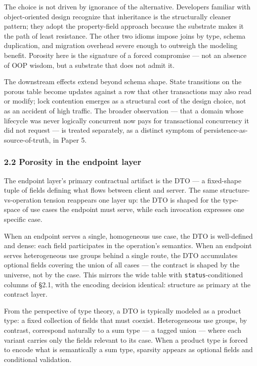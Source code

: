 \documentclass[
]{article}
\let\origtexttt\texttt%
\renewcommand{\texttt}[1]{\origtexttt{\seqsplit{#1}}}%
\let\texttt\origtexttt%
\begin{document}
The choice is not driven by ignorance of the alternative. Developers
familiar with object-oriented design recognize that inheritance is the
structurally cleaner pattern; they adopt the property-field approach
because the substrate makes it the path of least resistance. The other
two idioms impose joins by type, schema duplication, and migration
overhead severe enough to outweigh the modeling benefit. Porosity here
is the signature of a forced compromise --- not an absence of OOP
wisdom, but a substrate that does not admit it.

The downstream effects extend beyond schema shape. State transitions on
the porous table become updates against a row that other transactions
may also read or modify; lock contention emerges as a structural cost of
the design choice, not as an accident of high traffic. The broader
observation --- that a domain whose lifecycle was never logically
concurrent now pays for transactional concurrency it did not request ---
is treated separately, as a distinct symptom of
persistence-as-source-of-truth, in Paper 5.

\subsubsection{2.2 Porosity in the endpoint
layer}\label{porosity-in-the-endpoint-layer}

The endpoint layer's primary contractual artifact is the DTO --- a
fixed-shape tuple of fields defining what flows between client and
server. The same structure-vs-operation tension reappears one layer up:
the DTO is shaped for the type-space of use cases the endpoint must
serve, while each invocation expresses one specific case.

When an endpoint serves a single, homogeneous use case, the DTO is
well-defined and dense: each field participates in the operation's
semantics. When an endpoint serves heterogeneous use groups behind a
single route, the DTO accumulates optional fields covering the union of
all cases --- the contract is shaped by the universe, not by the case.
This mirrors the wide table with \texttt{status}-conditioned columns of
§2.1, with the encoding decision identical: structure as primary at the
contract layer.

From the perspective of type theory, a DTO is typically modeled as a
product type: a fixed collection of fields that must coexist.
Heterogeneous use groups, by contrast, correspond naturally to a sum
type --- a tagged union --- where each variant carries only the fields
relevant to its case. When a product type is forced to encode what is
semantically a sum type, sparsity appears as optional fields and
conditional validation.
\end{document}
